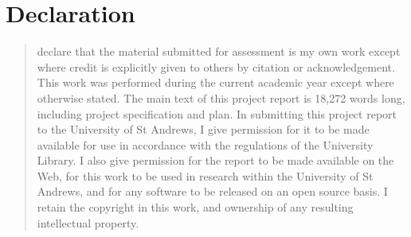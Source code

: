 \chapter*{Declaration}
\begin{SingleSpace}
\begin{quote}
 declare that the material submitted for assessment is my own work except where credit is explicitly given to others by citation or acknowledgement. This work was performed during the current academic year except where otherwise stated. The main text of this project report is 18,272 words long, including project specification and plan. In submitting this project report to the University of St Andrews, I give permission for it to be made available for use in accordance with the regulations of the University Library. I also give permission for the report to be made available on the Web, for this work to be used in research within the University of St Andrews, and for any software to be released on an open source basis. I retain the copyright in this work, and ownership of any resulting intellectual property.

\vspace{1.5cm}
\noindent
\end{quote}
\end{SingleSpace}
\clearpage